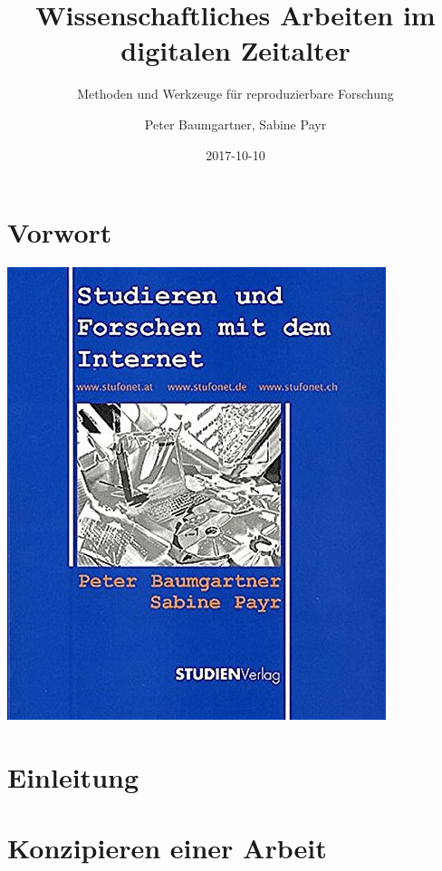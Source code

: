 \documentclass[]{book}
\title{Wissenschaftliches Arbeiten im digitalen Zeitalter}
\subtitle{Methoden und Werkzeuge für reproduzierbare Forschung}
\author{Peter Baumgartner, Sabine Payr}
\date{2017-10-10}
\theoremstyle{definition}
\theoremstyle{definition}
\theoremstyle{definition}
\theoremstyle{remark}
\begin{document}
\maketitle

{
\hypersetup{linkcolor=black}
\setcounter{tocdepth}{2}
\tableofcontents
}
\chapter*{Vorwort}\label{vorwort}

\begin{center}\href{http://www.studienverlag.at/page.cfm?vpath=buecher/buchdetail&titnr=1319}{\includegraphics{images/cover-stufonet-min} }\end{center}

\chapter*{Einleitung}\label{einleitung}

\chapter{Konzipieren einer Arbeit}\label{konzipieren-einer-arbeit}
\end{document}
